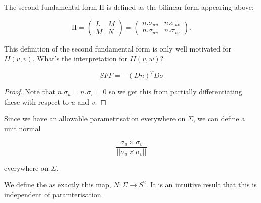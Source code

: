 \documentclass[11pt]{scrartcl}
\begin{document}
\begin{definition}
    The second fundamental form $\text{II}$ is defined as the bilinear form appearing above;

    \begin{equation}
        \text{II} = \begin{pmatrix} L & M \\ M & N \end{pmatrix} = \begin{pmatrix} n.\sigma_{uu} & n.\sigma_{uv} \\ n.\sigma_{uv} & n.\sigma_{vv} \end{pmatrix}.        
    \end{equation}
\end{definition}

\begin{remark}
    This definition of the second fundamental form is only well motivated for $II(v, v)$. What's the interpretation for $II(v,w)$?
\end{remark}



\begin{theorem}

\begin{equation}
    SFF = - (Dn)^T D\sigma
\end{equation}

\begin{proof}
Note that $n . \sigma_u = n . \sigma_v = 0$ so we get this from partially differentiating these with respect to $u$ and $v$.
\end{proof}

\end{theorem}

Since we have an allowable parametrisation everywhere on $\Sigma$, we can define a unit normal

\begin{equation}
    \frac{ \sigma_u \times \sigma_v }{|| \sigma_u \times \sigma_v ||}
\end{equation}

everywhere on $\Sigma$.


We define the  as exactly this map, $N : \Sigma \rightarrow S^2$. It is an intuitive result that this is independent of paramterisation.
\end{document}
